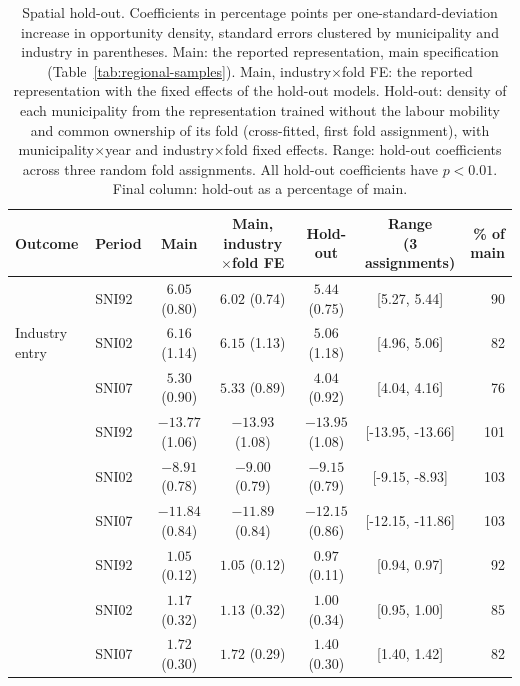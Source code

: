 \documentclass[9pt,twoside]{pnas-new}
\begin{document}
\begin{table}[H]
\centering
\small
\setlength{\tabcolsep}{4pt}
\caption{Spatial hold-out. Coefficients in percentage points per one-standard-deviation increase in opportunity density, standard errors clustered by municipality and industry in parentheses. Main: the reported representation, main specification (Table~\ref{tab:regional-samples}). Main, industry$\times$fold FE: the reported representation with the fixed effects of the hold-out models. Hold-out: density of each municipality from the representation trained without the labour mobility and common ownership of its fold (cross-fitted, first fold assignment), with municipality$\times$year and industry$\times$fold fixed effects. Range: hold-out coefficients across three random fold assignments. All hold-out coefficients have $p<0.01$. Final column: hold-out as a percentage of main.}
\label{tab:holdout-spatial}
\begin{tabular}{llccccr}
\toprule
Outcome & Period & Main & \shortstack{Main, industry\\$\times$fold FE} & Hold-out & \shortstack{Range\\(3 assignments)} & \shortstack{\% of\\main} \\
\midrule
\multirow{3}{*}{Industry entry} & SNI92 & $6.05$ (0.80) & $6.02$ (0.74) & $5.44$ (0.75) & [5.27, 5.44] & 90 \\
 & SNI02 & $6.16$ (1.14) & $6.15$ (1.13) & $5.06$ (1.18) & [4.96, 5.06] & 82 \\
 & SNI07 & $5.30$ (0.90) & $5.33$ (0.89) & $4.04$ (0.92) & [4.04, 4.16] & 76 \\
\addlinespace
\multirow{3}{*}{Industry exit} & SNI92 & $-13.77$ (1.06) & $-13.93$ (1.08) & $-13.95$ (1.08) & [-13.95, -13.66] & 101 \\
 & SNI02 & $-8.91$ (0.78) & $-9.00$ (0.79) & $-9.15$ (0.79) & [-9.15, -8.93] & 103 \\
 & SNI07 & $-11.84$ (0.84) & $-11.89$ (0.84) & $-12.15$ (0.86) & [-12.15, -11.86] & 103 \\
\addlinespace
\multirow{3}{*}{Startup formation} & SNI92 & $1.05$ (0.12) & $1.05$ (0.12) & $0.97$ (0.11) & [0.94, 0.97] & 92 \\
 & SNI02 & $1.17$ (0.32) & $1.13$ (0.32) & $1.00$ (0.34) & [0.95, 1.00] & 85 \\
 & SNI07 & $1.72$ (0.30) & $1.72$ (0.29) & $1.40$ (0.30) & [1.40, 1.42] & 82 \\
\bottomrule
\end{tabular}
\end{table}
\end{document}
